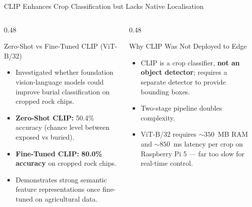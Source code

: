 \documentclass[aspectratio=169,10pt]{beamer}
\begin{document}
\begin{frame}{CLIP Enhances Crop Classification but Lacks Native Localisation}
\begin{columns}[T]
  \begin{column}{0.48\textwidth}
    \begin{block}{\small Zero-Shot vs Fine-Tuned CLIP (ViT-B/32)}
      \small
      \begin{itemize}
        \item Investigated whether foundation vision-language models could improve burial classification on cropped rock chips.
        \item \textbf{Zero-Shot CLIP:} 50.4\% accuracy (chance level between exposed vs buried).
        \item \textbf{Fine-Tuned CLIP:} \textbf{80.0\% accuracy} on cropped rock chips.
        \item Demonstrates strong semantic feature representations once fine-tuned on agricultural data.
      \end{itemize}
    \end{block}
  \end{column}
  \begin{column}{0.48\textwidth}
    \begin{block}{\small Why CLIP Was Not Deployed to Edge}
      \small
      \begin{itemize}
        \item CLIP is a crop classifier, \textbf{not an object detector}; requires a separate detector to provide bounding boxes.
        \item Two-stage pipeline doubles complexity.
        \item ViT-B/32 requires $\sim 350$~MB RAM and $\sim 850$~ms latency per crop on Raspberry Pi 5 --- far too slow for real-time control.
      \end{itemize}
    \end{block}
  \end{column}
\end{columns}
\end{frame}

\end{document}
